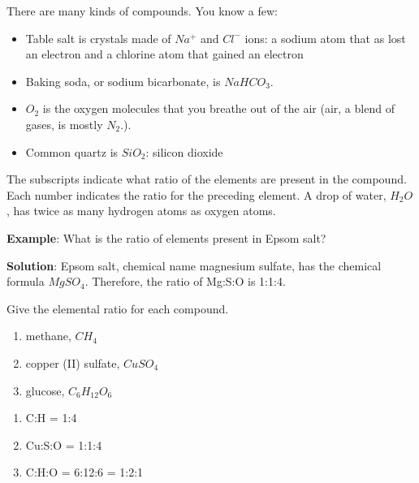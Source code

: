 There are many kinds of compounds. You know a few:
\begin{itemize}
\item Table salt is crystals made of $Na^{+}$ and $Cl^{-}$ ions: a sodium atom 
that as lost an electron and a chlorine atom that gained an electron
\item Baking soda, or sodium bicarbonate, is $NaHCO_3$.
\item $O_2$ is the oxygen molecules that you breathe out of the air (air, a
blend of gases, is mostly $N_2$.).
\item Common quartz is $SiO_2$: silicon dioxide
\end{itemize}

The subscripts indicate what ratio of the elements are present in the compound. 
Each number indicates the ratio for the preceding element. A drop of water, 
$H_2O$, has twice as many hydrogen atoms as oxygen atoms. 

\textbf{Example}: What is the ratio of elements present in Epsom salt?

\textbf{Solution}: Epsom salt, chemical name magnesium sulfate, has the chemical formula $MgSO_4$. Therefore, the ratio of Mg:S:O is 1:1:4. 


\begin{Exercise}[title = {Numbers of Atoms in Molecules}, label = num_atom]
Give the elemental ratio for each compound. 
\begin{enumerate}
\item methane, $CH_4$
\item copper (II) sulfate, $CuSO_4$
\item glucose, $C_6H_{12}O_6$
\end{enumerate}
\end{Exercise}

\begin{Answer}[ref = num_atom]
\begin{enumerate}
\item C:H = 1:4
\item Cu:S:O = 1:1:4
\item C:H:O = 6:12:6 = 1:2:1
\end{enumerate}
\end{Answer}

